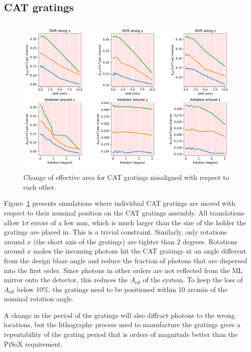 \documentclass[]{spie}  %
\begin{document}
\subsection{CAT gratings}
\begin{figure} [ht]
  \begin{center}
    \includegraphics[height=8cm]{CAT_individual.pdf}
  \end{center}
  \caption
      { \label{fig:CAT_individual}Change of effective area for CAT gratings misaligned with respect to each other.
}
\end{figure}

Figure~\ref{fig:CAT_individual} presents simulations where individual
CAT gratings are moved with respect to their nominal position on the
CAT gratings assembly. All translations allow $1\sigma$ errors of a few
mm, which is much larger than the size of the holder the gratings are
placed in. This is a trivial constraint. Similarly, only rotations
around $x$ (the short axis of the gratings) are tighter than 2
degrees. Rotations around $x$ makes the incoming photons hit the CAT
gratings at an angle different from the design blaze angle and reduce
the fraction of photons that are dispersed into the first order. Since
photons in other orders are not reflected from the ML mirror onto the
detector, this reduces the $A_{\mathrm{eff}}$ of the system. To keep the loss of $A_{\mathrm{eff}}$ below
10\%, the gratings need to be positioned within 10 arcmin of the
nominal rotation angle.

A change in the period of the gratings will also diffract photons to
the wrong locations, but the lithography process used to manufacture
the gratings gives a repeatability of the grating period that is
orders of magnitude better than the PiSoX requirement.
\end{document}
